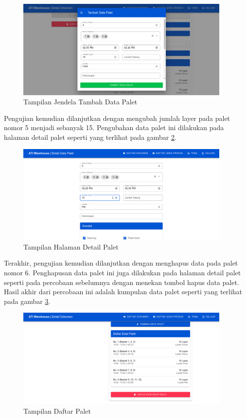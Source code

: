 \begin{figure} [ht!] \centering
  \includegraphics[width=0.95\textwidth]{gambar/tambah-palet.png}
  \caption{Tampilan Jendela Tambah Data Palet}
  \label{fig:tambahPalet}
\end{figure}

Pengujian kemudian dilanjutkan dengan mengubah jumlah layer pada palet nomor 5 menjadi sebanyak 15.
Pengubahan data palet ini dilakukan pada halaman detail palet seperti yang terlihat pada gambar \ref{fig:ubahPalet}.
\vspace{0.5ex}

\begin{figure} [ht!] \centering
  \includegraphics[width=0.95\textwidth]{gambar/ubah-palet.png}
  \caption{Tampilan Halaman Detail Palet}
  \label{fig:ubahPalet}
\end{figure}

Terakhir, pengujian kemudian dilanjutkan dengan menghapus data pada palet nomor 6.
Penghapusan data palet ini juga dilakukan pada halaman detail palet seperti pada percobaan sebelumnya dengan menekan tombol hapus data palet.
Hasil akhir dari percobaan ini adalah kumpulan data palet seperti yang terlihat pada gambar \ref{fig:daftarPalet}.
\vspace{0.5ex}

\begin{figure} [ht!] \centering
  \includegraphics[width=0.95\textwidth]{gambar/daftar-palet.png}
  \caption{Tampilan Daftar Palet}
  \label{fig:daftarPalet}
\end{figure}

